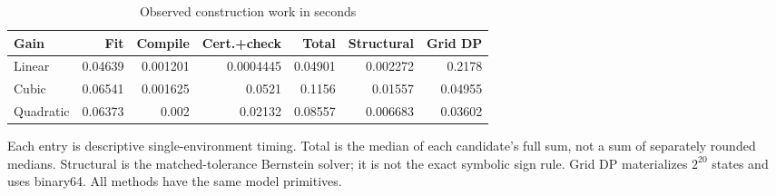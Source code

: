 \begin{table}[htbp]
\centering\footnotesize
\caption{Observed construction work in seconds}\label{tab:cost30}
\begin{tabular}{lrrrrrr}\toprule
Gain & Fit & Compile & Cert.+check & Total & Structural & Grid DP \\\midrule
Linear & 0.04639 & 0.001201 & 0.0004445 & 0.04901 & 0.002272 & 0.2178 \\
Cubic & 0.06541 & 0.001625 & 0.0521 & 0.1156 & 0.01557 & 0.04955 \\
Quadratic & 0.06373 & 0.002 & 0.02132 & 0.08557 & 0.006683 & 0.03602 \\
\bottomrule\end{tabular}
\par\smallskip\begin{minipage}{.98\textwidth}\footnotesize Each entry is descriptive single-environment timing. Total is the median of each candidate's full sum, not a sum of separately rounded medians. Structural is the matched-tolerance Bernstein solver; it is not the exact symbolic sign rule. Grid DP materializes $2^{20}$ states and uses binary64. All methods have the same model primitives.\end{minipage}
\end{table}
